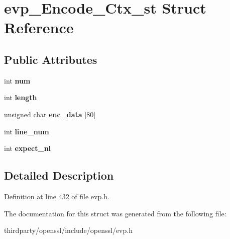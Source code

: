 \hypertarget{structevp___encode___ctx__st}{}\section{evp\+\_\+\+Encode\+\_\+\+Ctx\+\_\+st Struct Reference}
\label{structevp___encode___ctx__st}
\subsection*{Public Attributes}
\begin{DoxyCompactItemize}
\item 
\mbox{\label{structevp___encode___ctx__st_a7a68545e6131f26113bc316cb66e794d}} 
int {\bfseries num}
\item 
\mbox{\label{structevp___encode___ctx__st_ab5409ce49d7af9d0320f5bd1c9bbdfd4}} 
int {\bfseries length}
\item 
\mbox{\label{structevp___encode___ctx__st_ab2465a57d3ee1c0d7efba8f278c81911}} 
unsigned char {\bfseries enc\+\_\+data} \mbox{[}80\mbox{]}
\item 
\mbox{\label{structevp___encode___ctx__st_a92d2880fa44acb614cff2005fe3d74e3}} 
int {\bfseries line\+\_\+num}
\item 
\mbox{\label{structevp___encode___ctx__st_ae152066ba261286f7521992aefbfa952}} 
int {\bfseries expect\+\_\+nl}
\end{DoxyCompactItemize}


\subsection{Detailed Description}


Definition at line 432 of file evp.\+h.



The documentation for this struct was generated from the following file\+:\begin{DoxyCompactItemize}
\item 
thirdparty/openssl/include/openssl/evp.\+h\end{DoxyCompactItemize}
